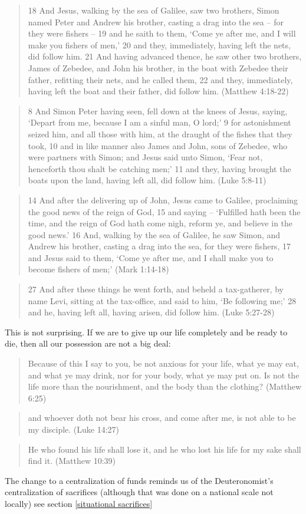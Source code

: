 \documentclass[11pt]{article}
\begin{document}
\begin{quote}
18 And Jesus, walking by the sea of Galilee, saw two brothers, Simon named Peter and Andrew his brother, casting a drag into the sea -- for they were fishers --
19 and he saith to them, `Come ye after me, and I will make you fishers of men,'
20 and they, immediately, having left the nets, did follow him.
21 And having advanced thence, he saw other two brothers, James of Zebedee, and John his brother, in the boat with Zebedee their father, refitting their nets, and he called them,
22 and they, immediately, having left the boat and their father, did follow him.
(Matthew 4:18-22)\end{quote}
 \begin{quote}
8 And Simon Peter having seen, fell down at the knees of Jesus, saying, `Depart from me, because I am a sinful man, O lord;'
9 for astonishment seized him, and all those with him, at the draught of the fishes that they took,
10 and in like manner also James and John, sons of Zebedee, who were partners with Simon; and Jesus said unto Simon, `Fear not, henceforth thou shalt be catching men;'
11 and they, having brought the boats upon the land, having left all, did follow him. (Luke 5:8-11)\end{quote}
\begin{quote}
14 And after the delivering up of John, Jesus came to Galilee, proclaiming the good news of the reign of God,
15 and saying -- `Fulfilled hath been the time, and the reign of God hath come nigh, reform ye, and believe in the good news.'
16 And, walking by the sea of Galilee, he saw Simon, and Andrew his brother, casting a drag into the sea, for they were fishers,
17 and Jesus said to them, `Come ye after me, and I shall make you to become fishers of men;' (Mark 1:14-18)\end{quote}
\begin{quote}
27 And after these things he went forth, and beheld a tax-gatherer, by name Levi, sitting at the tax-office, and said to him, `Be following me;'
28 and he, having left all, having arisen, did follow him.
(Luke 5:27-28)\end{quote}
This is not surprising. If we are to give up our life completely and be ready to die, then all our possession are not a big deal:
\begin{quote}
Because of this I say to you, be not anxious for your life, what ye may eat, and what ye may drink, nor for your body, what ye may put on. Is not the life more than the nourishment, and the body than the clothing? (Matthew 6:25)
\end{quote}
\begin{quote}
and whoever doth not bear his cross, and come after me, is not able to be my disciple. (Luke 14:27)
\end{quote}
\begin{quote}
He who found his life shall lose it, and he who lost his life for my sake shall find it. (Matthew 10:39) \end{quote}
The change to a centralization of funds reminds us of the Deuteronomist's centralization of sacrifices (although that was done on a national scale not locally) see section \ref{situational sacrifices} 
\end{document}
